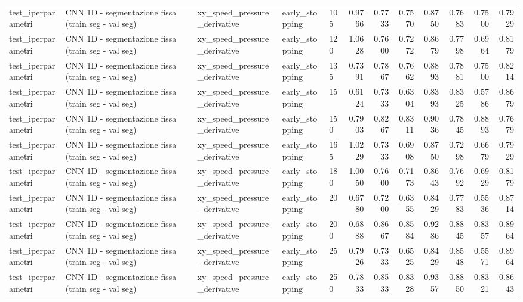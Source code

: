 \documentclass{article}
\begin{document}
\begin{table}[htbp]
\begin{adjustbox}{max width=\textwidth}
\begin{tabular}{lllllrrrrrrr}
test\_iperparametri & CNN 1D - segmentazione fissa (train seg - val seg) & xy\_speed\_pressure\_derivative & early\_stopping & 105 & 0.9766 & 0.7733 & 0.7570 & 0.8750 & 0.7683 & 0.7500 & 0.7929 \\
test\_iperparametri & CNN 1D - segmentazione fissa (train seg - val seg) & xy\_speed\_pressure\_derivative & early\_stopping & 120 & 1.0628 & 0.7600 & 0.7272 & 0.8679 & 0.7798 & 0.6964 & 0.8179 \\
test\_iperparametri & CNN 1D - segmentazione fissa (train seg - val seg) & xy\_speed\_pressure\_derivative & early\_stopping & 135 & 0.7391 & 0.7867 & 0.7662 & 0.8893 & 0.7881 & 0.7500 & 0.8214 \\
test\_iperparametri & CNN 1D - segmentazione fissa (train seg - val seg) & xy\_speed\_pressure\_derivative & early\_stopping & 15 & 0.6124 & 0.7333 & 0.6304 & 0.8393 & 0.8325 & 0.5786 & 0.8679 \\
test\_iperparametri & CNN 1D - segmentazione fissa (train seg - val seg) & xy\_speed\_pressure\_derivative & early\_stopping & 150 & 0.7903 & 0.8267 & 0.8311 & 0.9036 & 0.7845 & 0.8893 & 0.7679 \\
test\_iperparametri & CNN 1D - segmentazione fissa (train seg - val seg) & xy\_speed\_pressure\_derivative & early\_stopping & 165 & 1.0229 & 0.7333 & 0.6908 & 0.8750 & 0.7298 & 0.6679 & 0.7929 \\
test\_iperparametri & CNN 1D - segmentazione fissa (train seg - val seg) & xy\_speed\_pressure\_derivative & early\_stopping & 180 & 1.0050 & 0.7600 & 0.7173 & 0.8643 & 0.7692 & 0.6929 & 0.8179 \\
test\_iperparametri & CNN 1D - segmentazione fissa (train seg - val seg) & xy\_speed\_pressure\_derivative & early\_stopping & 20 & 0.6780 & 0.7200 & 0.6355 & 0.8429 & 0.7783 & 0.5536 & 0.8714 \\
test\_iperparametri & CNN 1D - segmentazione fissa (train seg - val seg) & xy\_speed\_pressure\_derivative & early\_stopping & 200 & 0.6888 & 0.8667 & 0.8584 & 0.9286 & 0.8845 & 0.8357 & 0.8964 \\
test\_iperparametri & CNN 1D - segmentazione fissa (train seg - val seg) & xy\_speed\_pressure\_derivative & early\_stopping & 25 & 0.7926 & 0.7333 & 0.6525 & 0.8429 & 0.8548 & 0.5571 & 0.8964 \\
test\_iperparametri & CNN 1D - segmentazione fissa (train seg - val seg) & xy\_speed\_pressure\_derivative & early\_stopping & 250 & 0.7833 & 0.8533 & 0.8328 & 0.9357 & 0.8850 & 0.8321 & 0.8643 \\

\end{tabular}
\end{adjustbox}
\end{table}
\end{document}
